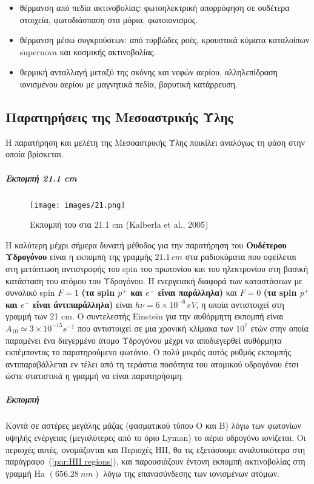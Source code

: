 \documentclass[a4paper,12pt]{memoir}
\begin{document}
\begin{itemize}
	\item θέρμανση από πεδία ακτινοβολίας: φωτοηλεκτρική απορρόφηση σε ουδέτερα στοιχεία, φωτοδιάσπαση στα μόρια, φωτοιονισμός.
	\item θέρμανση μέσω συγκρούσεων: από τυρβώδες ροές, κρουστικά κύματα καταλοίπων supernova και κοσμικής ακτινοβολίας.
	\item θερμική ανταλλαγή μεταξύ της σκόνης και νεφών αερίου, αλληλεπίδραση ιονισμένου αερίου με μαγνητικά πεδία, βαρυτική κατάρρευση. 
\end{itemize}

\subsection{Παρατηρήσεις της Μεσοαστρικής Ύλης}
Η παρατήρηση και μελέτη της Μεσοαστρικής Ύλης ποικίλει αναλόγως τη φάση στην οποία βρίσκεται.
\subparagraph{Εκπομπή 21.1 cm}
\begin{figure}[h]
	\label{fig:21}
	\centering
	\texttt{[image: images/21.png]}
	\caption{Εκπομπή του  στα 21.1 cm (Kalberla et al., 2005)\cite{kalberla_2005}}
\end{figure}

H καλύτερη μέχρι σήμερα δυνατή μέθοδος για την παρατήρηση του \textbf{Ουδέτερου Υδρογόνου } είναι η εκπομπή της γραμμής $21.1 \, cm$ στα ραδιοκύματα που οφείλεται στη μετάπτωση αντιστροφής του spin του πρωτονίου και του ηλεκτρονίου στη βασική κατάσταση του ατόμου του Υδρογόνου. Η ενεργειακή διαφορά των καταστάσεων με συνολικό spin $F=1$ \textbf{(τα spin $p^+$ και $e^-$ είναι παράλληλα)} και $F=0$ \textbf{(τα spin $p^+$ και $e^-$ είναι άντιπαράλληλα)} είναι $h \nu=6\times 10^{-6} \, eV$, η οποία αντιστοιχεί στη γραμμή των 21 cm.
Ο συντελεστής Einstein για την αυθόρμητη εκπομπή είναι $A_{10} \simeq 3\times 10^{-15}s^{-1}$ που αντιστοιχεί σε μια χρονική κλίμακα των $10^7$ ετών στην οποία παραμένει ένα διεγερμένο άτομο Υδρογόνου μέχρι να αποδιεγερθεί αυθόρμητα εκπέμποντας το παρατηρούμενο φωτόνιο. Ο πολύ μικρός αυτός ρυθμός εκπομπής αντιπαραβάλλεται εν τέλει από τη τεράστια ποσότητα του ατομικού υδρογόνου έτσι ώστε στατιστικά η γραμμή να είναι παρατηρήσιμη.

\subparagraph{Εκπομπή }
Κοντά σε αστέρες μεγάλης μάζας (φασματικού τύπου O και B) λόγω των φωτονίων υψηλής ενέργειας (μεγαλύτερες από το όριο Lyman) το αέριο υδρογόνο ιονίζεται. Οι περιοχές αυτές, ονομάζονται και Περιοχές HII, θα τις εξετάσουμε αναλυτικότερα στη παράγραφο~(\ref{par:HII regions}), και παρουσιάζουν έντονη εκπομπή ακτινοβολίας στη γραμμή Ha $(656.28\ nm)$ λόγω της επανασύνδεσης των ιονισμένων ατόμων.
\end{document}
